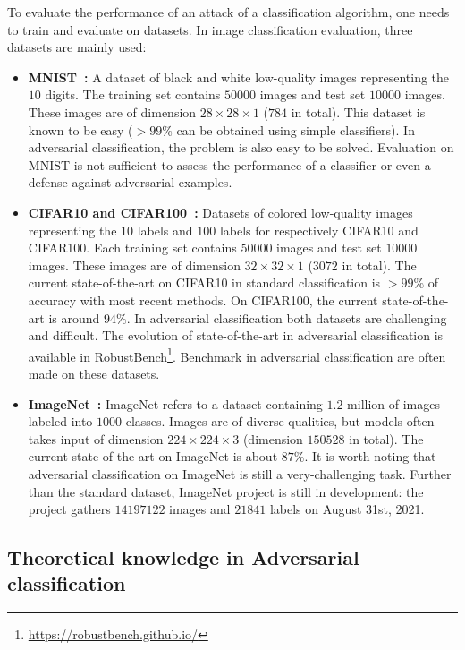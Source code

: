 To evaluate the performance of an attack of a classification algorithm, one needs to train and evaluate on datasets. In image classification evaluation, three datasets are mainly used:
\begin{itemize}
    \item \textbf{MNIST~\citep{lecun1998mnist}:} A dataset of black and white low-quality images representing the $10$ digits. The training set contains $50000$ images and test set $10000$ images. These images are of dimension $28\times28\times 1$ ($784$ in total). This dataset is known to be easy ($>99\%$ can be obtained using simple classifiers). In adversarial classification, the problem is also easy to be solved. Evaluation on MNIST is not sufficient to assess the performance of a classifier or even a defense against adversarial examples.
    \item \textbf{CIFAR10 and CIFAR100~\citep{krizhevsky2009learning}:} Datasets of colored low-quality images representing the $10$ labels and $100$ labels for respectively CIFAR10 and CIFAR100. Each training set contains $50000$ images and test set $10000$ images. These images are of dimension $32\times32\times 1$ ($3072$ in total). The current state-of-the-art on CIFAR10 in standard classification is $>99\%$ of accuracy with most recent methods. On CIFAR100, the current state-of-the-art is around $94\%$. In adversarial classification both datasets are challenging and difficult. The evolution of state-of-the-art in adversarial classification is available in RobustBench\footnote{\url{https://robustbench.github.io/}}. Benchmark in adversarial classification are often made on these datasets.
    \item \textbf{ImageNet~\citep{imagenet_cvpr09}:} ImageNet refers to a dataset containing $1.2$ million of images labeled into $1000$ classes. Images are of diverse qualities, but models often takes input of dimension $224\times224\times 3$ (dimension $150528$ in total). The current state-of-the-art on ImageNet is about $87\%$. It is worth noting that adversarial classification on ImageNet is still a very-challenging task. Further than the standard dataset, ImageNet project is still in development: the project gathers $14197122$ images and $21841$ labels on August 31st, 2021.   

\end{itemize}




\subsection{Theoretical knowledge in Adversarial classification}


